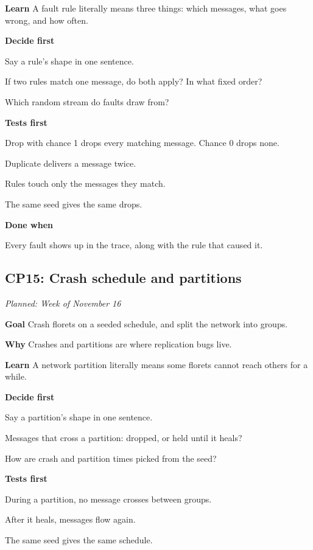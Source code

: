 \documentclass[11pt,letterpaper]{article}
\newcommand{\lbl}[1]{\textbf{#1}\enspace}
\newcommand{\when}[1]{\par\textit{Planned: #1}\par}
\begin{document}
\lbl{Learn} A fault rule literally means three things: which messages, what goes wrong, and how often.

\lbl{Decide first}
\begin{asks}
  \item Say a rule's shape in one sentence.
  \item If two rules match one message, do both apply? In what fixed order?
  \item Which random stream do faults draw from?
\end{asks}

\lbl{Tests first}
\begin{checks}
  \item Drop with chance 1 drops every matching message. Chance 0 drops none.
  \item Duplicate delivers a message twice.
  \item Rules touch only the messages they match.
  \item The same seed gives the same drops.
\end{checks}

\lbl{Done when}
\begin{checks}
  \item Every fault shows up in the trace, along with the rule that caused it.
\end{checks}

\subsection{CP15: Crash schedule and partitions}
\when{Week of November 16}

\lbl{Goal} Crash florets on a seeded schedule, and split the network into groups.

\lbl{Why} Crashes and partitions are where replication bugs live.

\lbl{Learn} A network partition literally means some florets cannot reach others for a while.

\lbl{Decide first}
\begin{asks}
  \item Say a partition's shape in one sentence.
  \item Messages that cross a partition: dropped, or held until it heals?
  \item How are crash and partition times picked from the seed?
\end{asks}

\lbl{Tests first}
\begin{checks}
  \item During a partition, no message crosses between groups.
  \item After it heals, messages flow again.
  \item The same seed gives the same schedule.
\end{checks}
\end{document}
